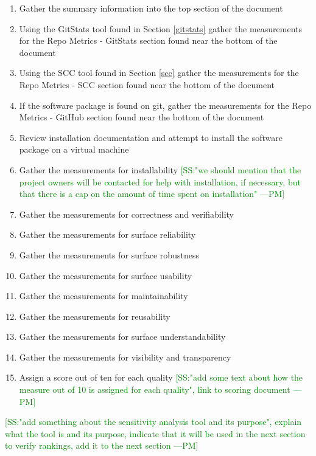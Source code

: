\documentclass[letterpaper,cleveref]{lipics-v2019}
\newcommand{\authornote}[3]{\textcolor{#1}{[#3 ---#2]}}
\newcommand{\authornote}[3]{}
\newcommand{\pmi}[1]{\authornote{green}{PM}{#1}} %
\theoremstyle{definition}
\begin{document}
\begin{enumerate} 
	\item Gather the summary information into the top section of the document
	\item Using the GitStats tool found in Section \ref{gitstats} gather the measurements for the Repo Metrics - GitStats section found near the bottom of the document
	\item Using the SCC tool found in Section \ref{scc} gather the measurements for the Repo Metrics - SCC section found near the bottom of the document
	\item If the software package is found on git, gather the measurements for the Repo Metrics - GitHub section found near the bottom of the document
	\item Review installation documentation and attempt to install the software package on a virtual machine
	\item Gather the measurements for installability
	\pmi{SS:"we should mention that the project owners will be contacted for help with installation, if necessary, but that there is a cap on the amount of time spent on installation"}
	\item Gather the measurements for correctness and verifiability
	\item Gather the measurements for surface reliability
	\item Gather the measurements for surface robustness
	\item Gather the measurements for surface usability
	\item Gather the measurements for maintainability
	\item Gather the measurements for reusability
	\item Gather the measurements for surface understandability
	\item Gather the measurements for visibility and transparency
	\item Assign a score out of ten for each quality \pmi{SS:"add some text about how the measure out of 10 is assigned for each quality", link to scoring document}
\end{enumerate}
\pmi{SS:"add something about the sensitivity analysis tool and its purpose", explain what the tool is and its purpose, indicate that it will be used in the next section to verify rankings, add it to the next section}
\end{document}
